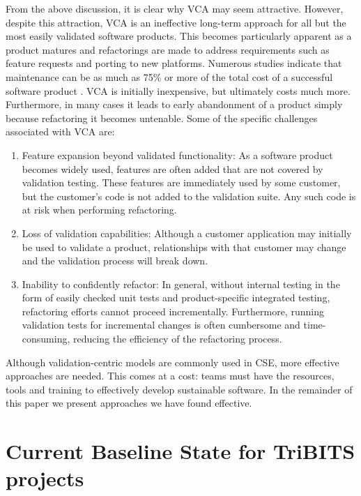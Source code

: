 \documentclass[11pt]{SANDreport}
\begin{document}
From the above discussion, it is clear why VCA may seem attractive. However, despite this attraction, VCA is an ineffective long-term approach for all but the most easily validated software products. This becomes particularly apparent as a product matures and refactorings are made to address requirements such as feature requests and porting to new platforms.  Numerous studies indicate that maintenance can be as much as 75\% or more of the total cost of a successful software product {}\cite{CodeComplete2nd04}.  VCA is initially inexpensive, but ultimately costs much more.  Furthermore, in many cases it leads to early abandonment of a product simply because refactoring it becomes untenable.  Some of the specific challenges associated with VCA are:

\begin{enumerate}

{}\item Feature expansion beyond validated functionality: As a software product becomes widely used, features are often added that are not covered by validation testing.  These features are immediately used by some customer, but the customer's code is not added to the validation suite.  Any such code is at risk when performing refactoring.

{}\item Loss of validation capabilities: Although a customer application may initially be used to validate a product, relationships with that customer may change and the validation process will break down.

{}\item Inability to confidently refactor: In general, without internal testing in the form of easily checked unit tests and product-specific integrated testing, refactoring efforts cannot proceed incrementally.  Furthermore, running validation tests for incremental changes is often cumbersome and time-consuming, reducing the efficiency of the refactoring process.

\end{enumerate}

Although validation-centric models are commonly used in CSE, more effective approaches are needed.  This comes at a cost: teams must have the resources, tools and training to effectively develop sustainable software.  In the remainder of this paper we present approaches we have found effective.


%
{}\section{Current Baseline State for TriBITS projects}
\label{sec:tribts_current_state}
%
\end{document}
